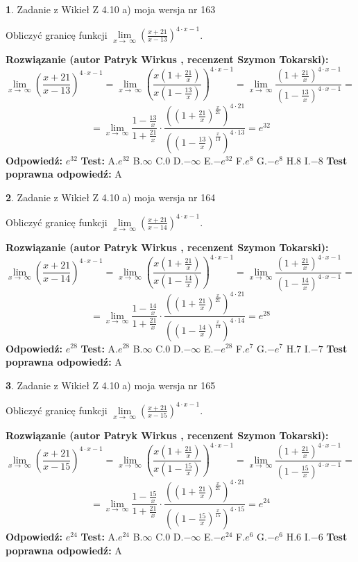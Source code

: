 \documentclass[12pt, a4paper]{article}
\theoremstyle{definition} %
\newtheorem{zad}{}
\newcommand{\zadStart}[1]{\begin{zad}#1\newline}
\newcommand{\zadStop}{\end{zad}}
\newcommand{\rozwStart}[2]{\noindent \textbf{Rozwiązanie (autor #1 , recenzent #2): }\newline}
\newcommand{\rozwStop}{\newline}
\newcommand{\odpStart}{\noindent \textbf{Odpowiedź:}\newline}
\newcommand{\odpStop}{\newline}
\newcommand{\testStart}{\noindent \textbf{Test:}\newline}
\newcommand{\testStop}{\newline}
\newcommand{\kluczStart}{\noindent \textbf{Test poprawna odpowiedź:}\newline}
\newcommand{\kluczStop}{\newline}
\begin{document}
\zadStart{Zadanie z Wikieł Z 4.10 a) moja wersja nr 163}

Obliczyć granicę funkcji  $\lim\limits_{x\to\ \infty}(\frac{x+21}{x-13})^{4\cdot x-1}$.
\zadStop
\rozwStart{Patryk Wirkus}{Szymon Tokarski}
$$\lim\limits_{x\to\ \infty}(\frac{x+21}{x-13})^{4\cdot x-1} = \lim\limits_{x\to\ \infty}(\frac{x(1+\frac{21}{x})}{x(1-\frac{13}{x})})^{4\cdot x-1}=\lim\limits_{x\to\ \infty}\frac{(1+\frac{21}{x})^{4\cdot x-1}}{(1-\frac{13}{x})^{4\cdot x-1}}=$$
$$=\lim\limits_{x\to\ \infty}\frac{1-\frac{13}{x}}{1+\frac{21}{x}}\cdot\frac{((1+\frac{21}{x})^{\frac{x}{21}})^{4\cdot21}}{((1-\frac{13}{x})^{\frac{x}{13}})^{4\cdot13}}=e^{32}$$
\rozwStop
\odpStart
$e^{32}$
\odpStop
\testStart
A.$e^{32}$ B.$\infty$ C.$0$ D.$-\infty$ E.$-e^{32}$
F.$e^{8}$ G.$-e^{8}$
H.$8$
I.$-8$
\testStop
\kluczStart
A
\kluczStop



\zadStart{Zadanie z Wikieł Z 4.10 a) moja wersja nr 164}

Obliczyć granicę funkcji  $\lim\limits_{x\to\ \infty}(\frac{x+21}{x-14})^{4\cdot x-1}$.
\zadStop
\rozwStart{Patryk Wirkus}{Szymon Tokarski}
$$\lim\limits_{x\to\ \infty}(\frac{x+21}{x-14})^{4\cdot x-1} = \lim\limits_{x\to\ \infty}(\frac{x(1+\frac{21}{x})}{x(1-\frac{14}{x})})^{4\cdot x-1}=\lim\limits_{x\to\ \infty}\frac{(1+\frac{21}{x})^{4\cdot x-1}}{(1-\frac{14}{x})^{4\cdot x-1}}=$$
$$=\lim\limits_{x\to\ \infty}\frac{1-\frac{14}{x}}{1+\frac{21}{x}}\cdot\frac{((1+\frac{21}{x})^{\frac{x}{21}})^{4\cdot21}}{((1-\frac{14}{x})^{\frac{x}{14}})^{4\cdot14}}=e^{28}$$
\rozwStop
\odpStart
$e^{28}$
\odpStop
\testStart
A.$e^{28}$ B.$\infty$ C.$0$ D.$-\infty$ E.$-e^{28}$
F.$e^{7}$ G.$-e^{7}$
H.$7$
I.$-7$
\testStop
\kluczStart
A
\kluczStop



\zadStart{Zadanie z Wikieł Z 4.10 a) moja wersja nr 165}

Obliczyć granicę funkcji  $\lim\limits_{x\to\ \infty}(\frac{x+21}{x-15})^{4\cdot x-1}$.
\zadStop
\rozwStart{Patryk Wirkus}{Szymon Tokarski}
$$\lim\limits_{x\to\ \infty}(\frac{x+21}{x-15})^{4\cdot x-1} = \lim\limits_{x\to\ \infty}(\frac{x(1+\frac{21}{x})}{x(1-\frac{15}{x})})^{4\cdot x-1}=\lim\limits_{x\to\ \infty}\frac{(1+\frac{21}{x})^{4\cdot x-1}}{(1-\frac{15}{x})^{4\cdot x-1}}=$$
$$=\lim\limits_{x\to\ \infty}\frac{1-\frac{15}{x}}{1+\frac{21}{x}}\cdot\frac{((1+\frac{21}{x})^{\frac{x}{21}})^{4\cdot21}}{((1-\frac{15}{x})^{\frac{x}{15}})^{4\cdot15}}=e^{24}$$
\rozwStop
\odpStart
$e^{24}$
\odpStop
\testStart
A.$e^{24}$ B.$\infty$ C.$0$ D.$-\infty$ E.$-e^{24}$
F.$e^{6}$ G.$-e^{6}$
H.$6$
I.$-6$
\testStop
\kluczStart
A
\kluczStop
\end{document}
